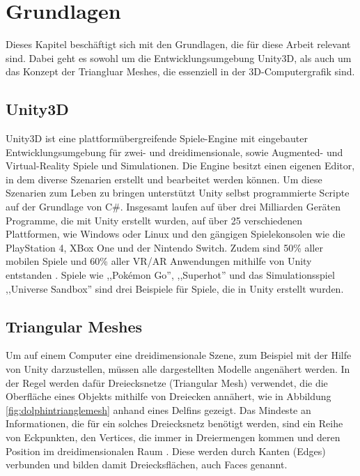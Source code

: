 \section{Grundlagen}
Dieses Kapitel besch\"aftigt sich mit den Grundlagen, die f\"ur diese Arbeit relevant sind. Dabei geht es sowohl um die Entwicklungsumgebung Unity3D, als auch um das Konzept der Triangluar Meshes, die essenziell in der 3D-Computergrafik sind.

\subsection{Unity3D}
Unity3D ist eine plattform\"ubergreifende Spiele-Engine mit eingebauter Entwicklungsumgebung f\"ur zwei- und dreidimensionale, sowie Augmented- und Virtual-Reality Spiele und Simulationen. Die Engine besitzt einen eigenen Editor, in dem diverse Szenarien erstellt und bearbeitet werden k\"onnen. Um diese Szenarien zum Leben zu bringen unterst\"utzt Unity selbst programmierte Scripte auf der Grundlage von C\#. Insgesamt laufen auf \"uber drei Milliarden Ger\"aten Programme, die mit Unity erstellt wurden, auf \"uber 25 verschiedenen Plattformen, wie Windows oder Linux und den g\"angigen Spielekonsolen wie die PlayStation 4, XBox One und der Nintendo Switch. Zudem sind 50\% aller mobilen Spiele und 60\% aller VR/AR Anwendungen mithilfe von Unity entstanden \cite{Unity}. Spiele wie ,,Pok\'emon Go'', ,,Superhot'' und das Simulationsspiel ,,Universe Sandbox'' sind drei Beispiele f\"ur Spiele, die in Unity erstellt wurden.

\subsection{Triangular Meshes}
Um auf einem Computer eine dreidimensionale Szene, zum Beispiel mit der Hilfe von Unity darzustellen, m\"ussen alle dargestellten Modelle angen\"ahert werden. In der Regel werden daf\"ur Dreiecksnetze (Triangular Mesh) verwendet, die die Oberfl\"ache eines Objekts mithilfe von Dreiecken ann\"ahert, wie in Abbildung \ref{fig:dolphintrianglemesh} anhand eines Delfins gezeigt. Das Mindeste an Informationen, die f\"ur ein solches Dreiecksnetz ben\"otigt werden, sind ein Reihe von Eckpunkten, den Vertices, die immer in Dreiermengen kommen und deren Position im dreidimensionalen Raum \cite[S.262]{Shirley2010}. Diese werden durch Kanten (Edges) verbunden und bilden damit Dreiecksfl\"achen, auch Faces genannt.

